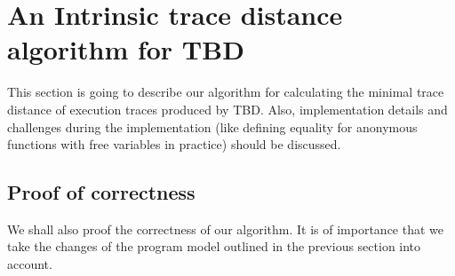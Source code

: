 \section{An Intrinsic trace distance algorithm for TBD}
This section is going to describe our algorithm for calculating the minimal trace distance of execution traces produced by TBD. Also, implementation details and challenges during the implementation (like defining equality for anonymous functions with free variables in practice) should be discussed.

\subsection{Proof of correctness}
We shall also proof the correctness of our algorithm. It is of importance that we take the changes of the program model outlined in the previous section into account. 